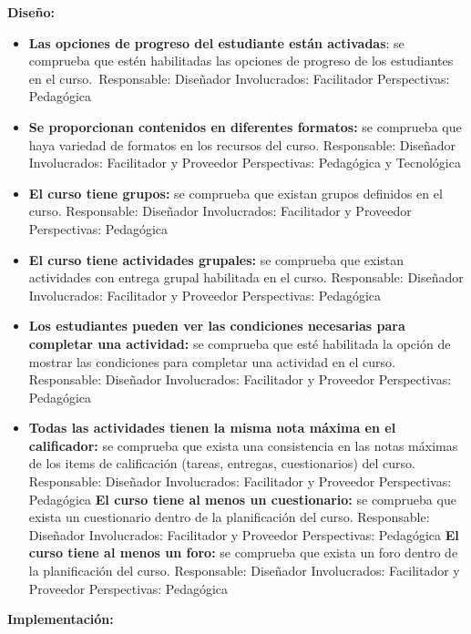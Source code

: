 \textbf{Diseño:}

\begin{itemize}
	\item
	\textbf{Las opciones de progreso del estudiante están activadas}: se
	comprueba que estén habilitadas las opciones de progreso de los
	estudiantes en el curso.~{Responsable:} Diseñador
	{Involucrados:} Facilitador {Perspectivas:} Pedagógica
	\item
	\textbf{Se proporcionan contenidos en diferentes formatos:} se
	comprueba que haya variedad de formatos en los recursos del curso.
	{Responsable:} Diseñador {Involucrados:} Facilitador y
	Proveedor {Perspectivas:} Pedagógica y Tecnológica
	\item
	\textbf{El curso tiene grupos:} se comprueba que existan grupos
	definidos en el curso. {Responsable:} Diseñador
	{Involucrados:} Facilitador y Proveedor {Perspectivas:}
	Pedagógica
	\item
	\textbf{El curso tiene actividades grupales:} se comprueba que existan
	actividades con entrega grupal habilitada en el curso.
	{Responsable:} Diseñador {Involucrados:} Facilitador y
	Proveedor {Perspectivas:} Pedagógica
	\item
	\textbf{Los estudiantes pueden ver las condiciones necesarias para
		completar una actividad:} se comprueba que esté habilitada la opción
	de mostrar las condiciones para completar una actividad en el curso.
	{Responsable:} Diseñador {Involucrados:} Facilitador y
	Proveedor {Perspectivas:} Pedagógica
	\item
	\textbf{Todas las actividades tienen la misma nota máxima en el
		calificador:} se comprueba que exista una consistencia en las notas
	máximas de los items de calificación (tareas, entregas, cuestionarios)
	del curso. {Responsable:} Diseñador {Involucrados:}
	Facilitador y Proveedor {Perspectivas:} Pedagógica
	\textbf{El curso tiene al menos un cuestionario:} se comprueba que exista un cuestionario dentro de la planificación del curso.
    {Responsable:} Diseñador {Involucrados:} Facilitador y Proveedor {Perspectivas:} Pedagógica
	\textbf{El curso tiene al menos un foro:} se comprueba que exista un foro dentro de la planificación del curso.
    {Responsable:} Diseñador {Involucrados:} Facilitador y Proveedor {Perspectivas:} Pedagógica
\end{itemize}

\textbf{Implementación:}

